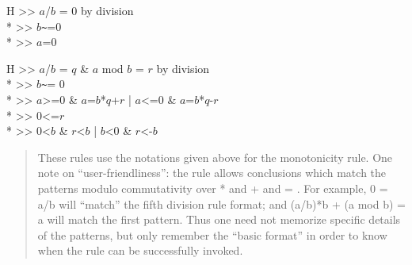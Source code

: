 \goal  H >> $a$/$b$ = 0   by division\\*
\subgoal      >> $b$\verb`~`=0\\*
\subgoal      >> $a$=0

\goalskip

\goal  H >> $a$/$b$ = $q$ \& $a$ mod $b$ = $r$   by division\\*
\subgoal      >> $b$\verb`~`= 0\\*
\subgoal      >> $a$>=0 \& $a$=$b$*$q$+$r$ | $a$<=0 \& $a$=$b$*$q$-$r$\\*
\subgoal      >> 0<=$r$\\*
\subgoal      >> 0<$b$ \& $r$<$b$ | $b$<0 \& $r$<-$b$
\begin{quote}\rm
These rules use the notations given above for the monotonicity rule.
One note on ``user-friendliness'': the rule allows conclusions which match
the patterns modulo commutativity over * and + and = .  For example, 0 =
a/b will ``match'' the fifth division rule format; and (a/b)*b + (a mod b) =
a will match the first pattern.  Thus one need not memorize specific
details of the patterns, but only remember the ``basic format'' in order to
know when the rule can be successfully invoked.
\end{quote}



\rm
